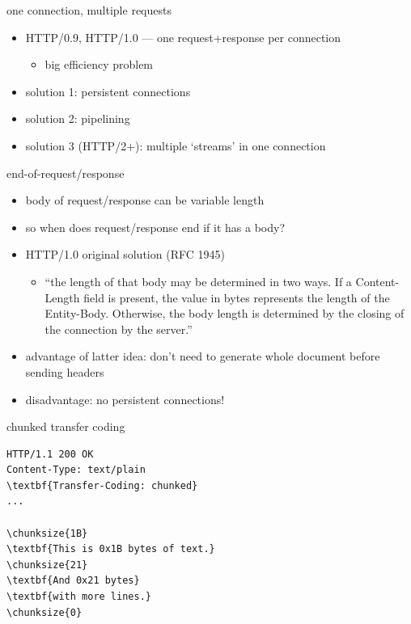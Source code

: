 \begin{frame}{one connection, multiple requests}
    \begin{itemize}
    \item HTTP/0.9, HTTP/1.0 --- one request+response per connection
        \begin{itemize}
        \item big efficiency problem
        \end{itemize}
    \item solution 1: persistent connections
    \item solution 2: pipelining
    \item solution 3 (HTTP/2+): multiple `streams' in one connection
    \end{itemize}
\end{frame}

\begin{frame}{end-of-request/response}
    \begin{itemize}
    \item body of request/response can be variable length
    \vspace{.5cm}
    \item so when does request/response end if it has a body?
    \item HTTP/1.0 original solution (RFC 1945)
        \begin{itemize}
        \item ``the length of that body may be determined in two ways. If a Content-Length field is present, the value in bytes represents the length of the Entity-Body. Otherwise, the body length is determined by the closing of the connection by the server.''
        \end{itemize}
    \item advantage of latter idea: don't need to generate whole document before sending headers
    \item disadvantage: no persistent connections!
    \end{itemize}
\end{frame}


\providecommand{\chunksize}[1]{\textbf{\color{violet!80}#1}}
\begin{frame}[fragile,label=chunked]{chunked transfer coding}
\begin{Verbatim}[commandchars=\\\{\}]
HTTP/1.1 200 OK
Content-Type: text/plain
\textbf{Transfer-Coding: chunked}
...

\chunksize{1B}
\textbf{This is 0x1B bytes of text.}
\chunksize{21}
\textbf{And 0x21 bytes}
\textbf{with more lines.}
\chunksize{0}
\end{Verbatim}
\end{frame}

